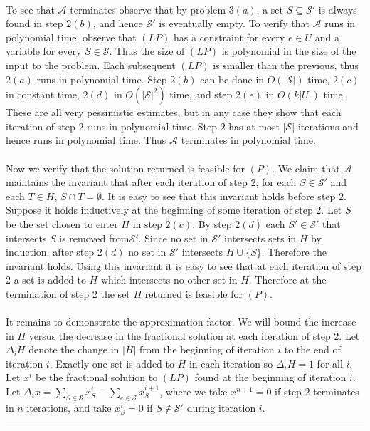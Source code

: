 \documentclass[letterpaper,12pt,oneside,onecolumn]{article}
\newcommand{\cA}{\mathcal{A}} \newcommand{\cB}{\mathcal{B}}
\newcommand{\cS}{\mathcal{S}} \newcommand{\cT}{\mathcal{T}}
\newenvironment{proof}{{\bf Proof:  }}{\hfill\rule{2mm}{2mm}}
\begin{document}
\begin{proof}
\paragraph{}
To see that $\cA$ terminates observe that by problem $3(a)$, a set $S \subseteq \cS'$ is always found in step $2(b)$, and hence $\cS'$ is eventually empty. To verify that $\cA$ runs in polynomial time, observe that $(LP)$ has a constraint for every $e \in U$ and a variable for every $S \in \cS$. Thus the size of $(LP)$ is polynomial in the size of the input to the problem. Each subsequent $(LP)$ is smaller than the previous, thus $2(a)$ runs in polynomial time. Step $2(b)$ can be done in $O(|\cS|)$ time, $2(c)$ in constant time, $2(d)$ in $O(|\cS|^2)$ time, and step $2(e)$ in $O(k|U|)$ time. These are all very pessimistic estimates,  but in any case they show that each iteration of step $2$ runs in polynomial time. Step $2$ has at most $|\cS|$ iterations and hence runs in polynomial time. Thus $\cA$ terminates in polynomial time.
\paragraph{}
Now we verify that the solution returned is feasible for $(P)$. We claim that $\cA$ maintains the invariant that after each iteration of step $2$, for each $S \in \cS'$ and each $T \in H$, $S\cap T = \emptyset$. It is easy to see that this invariant holds before step $2$. Suppose it holds inductively at the beginning of some iteration of step $2$. Let $S$ be the set chosen to enter $H$ in step $2(c)$. By step $2(d)$ each $S' \in \cS'$ that intersects $S$ is removed from$ \cS'$. Since no set in $\cS'$ intersects sets in $H$ by induction, after step $2(d)$ no set in $\cS'$ intersects $H \cup \{S\}$. Therefore the invariant holds. Using this invariant it is easy to see that at each iteration of step $2$ a set is added to $H$ which intersects no other set in $H$. Therefore at the termination of step $2$ the set $H$ returned is feasible for $(P)$.
\paragraph{}
It remains to demonstrate the approximation factor. We will bound the increase in $H$ versus the decrease in the fractional solution at each iteration of step $2$. Let $\Delta_i H$ denote the change in $|H|$ from the beginning of iteration $i$ to the end of iteration $i$. Exactly one set is added to $H$ in each iteration so $\Delta_i H = 1$ for all $i$. Let $x^i$ be the fractional solution to $(LP)$ found at the beginning of iteration $i$. Let $\Delta_i x = \sum_{S \in \cS}x^{i}_S - \sum_{e \in \cS}x^{i+1}_S$, where we take $x^{n+1} = 0$ if step $2$ terminates in $n$ iterations, and take $x^{i}_S = 0$ if $S \not\in \cS'$ during iteration $i$.

\end{proof}
\end{document}
